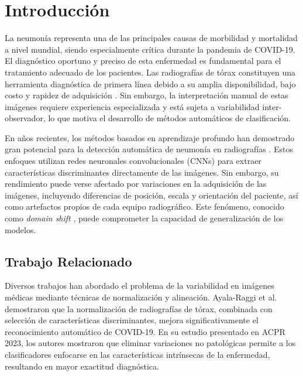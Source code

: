 \documentclass[runningheads]{llncs}
\begin{document}
\section{Introducción}
\label{sec:introduccion}

La neumonía representa una de las principales causas de morbilidad y mortalidad a nivel mundial, siendo especialmente crítica durante la pandemia de COVID-19. El diagnóstico oportuno y preciso de esta enfermedad es fundamental para el tratamiento adecuado de los pacientes. Las radiografías de tórax constituyen una herramienta diagnóstica de primera línea debido a su amplia disponibilidad, bajo costo y rapidez de adquisición \cite{who2020chest}. Sin embargo, la interpretación manual de estas imágenes requiere experiencia especializada y está sujeta a variabilidad inter-observador, lo que motiva el desarrollo de métodos automáticos de clasificación.

En años recientes, los métodos basados en aprendizaje profundo han demostrado gran potencial para la detección automática de neumonía en radiografías \cite{rajpurkar2017chexnet,wang2020covidnet,chowdhury2020can}. Estos enfoques utilizan redes neuronales convolucionales (CNNs) para extraer características discriminantes directamente de las imágenes. Sin embargo, su rendimiento puede verse afectado por variaciones en la adquisición de las imágenes, incluyendo diferencias de posición, escala y orientación del paciente, así como artefactos propios de cada equipo radiográfico. Este fenómeno, conocido como \textit{domain shift} \cite{zech2018variable}, puede comprometer la capacidad de generalización de los modelos.

\subsection{Trabajo Relacionado}

Diversos trabajos han abordado el problema de la variabilidad en imágenes médicas mediante técnicas de normalización y alineación. Ayala-Raggi et al. \cite{ayala2023synergizing} demostraron que la normalización de radiografías de tórax, combinada con selección de características discriminantes, mejora significativamente el reconocimiento automático de COVID-19. En su estudio presentado en ACPR 2023, los autores mostraron que eliminar variaciones no patológicas permite a los clasificadores enfocarse en las características intrínsecas de la enfermedad, resultando en mayor exactitud diagnóstica.
\end{document}
